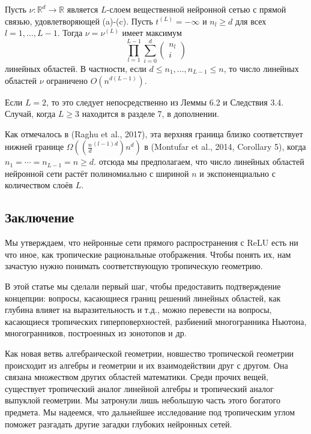 \documentclass[russian]{lecture-notes}
\begin{document}
		\begin{Theorem}
			Пусть $\nu : \mathbb{R}^d \rightarrow \mathbb{R}$ является $L$-слоем вещественной нейронной сетью с прямой связью, удовлетворяющей (a)-(c). Пусть $t^{(L)} = -\infty$ и $n_l \geq d$ для всех $l = 1,\dots,L-1$. Тогда $\nu = \nu^{(L)}$ имеет максимум
			\[
				\prod\limits_{l=1}^{L-1}\sum\limits_{i = 0}^{d} \begin{pmatrix}
				n_l\\
				i
				\end{pmatrix}
			\]
			линейных областей. В частности, если $d\leq n_1,\dots ,n_{L-1} \leq n$, то число линейных областей $\nu$ ограничено $O(n^{d(L-1)})$.
		\end{Theorem}
		
		\begin{Proof}
			Если $L = 2$, то это следует непосредственно из Леммы 6.2 и Следствия 3.4. Случай, когда $L \geq 3$ находится в разделе 7, в дополнении.
		\end{Proof}
	
	Как отмечалось в (Raghu et al., 2017), эта верхняя граница близко соответствует нижней границе $\Omega ((\frac{n}{d}^{(l-1)d})  n^d)$ в (Montufar et al., 2014, Corollary 5), когда $n_1 = \cdots = n_{L-1} = n \geq d$. отсюда мы предполагаем, что число линейных областей нейронной сети растёт полиномиально с шириной $n$ и экспоненциально с количеством слоёв $L$.
	
	\subsection{Заключение}
	
	Мы утверждаем, что нейронные сети прямого распространения с ReLU есть ни что иное, как тропические рациональные отображения. Чтобы понять их, нам зачастую нужно понимать соответствующую тропическую геометрию.
	
	В этой статье мы сделали первый шаг, чтобы предоставить подтверждение концепции: вопросы, касающиеся границ решений линейных областей, как глубина влияет на выразительность и т.д., можно перевести на вопросы, касающиеся тропических гиперповерхностей, разбиений многогранника Ньютона, многогранников, построенных из зонотопов и др.
	
	Как новая ветвь алгебраической геометрии, новшество тропической геометрии происходит из алгебры и геометрии и их взаимодействии друг с другом. Она связана множеством других областей математики. Среди прочих вещей, существует тропический аналог линейной алгебры и тропический аналог выпуклой геометрии. Мы затронули лишь небольшую часть этого богатого предмета. Мы надеемся, что дальнейшее исследование под тропическим углом поможет разгадать другие загадки глубоких нейронных сетей.
	
\end{document}
